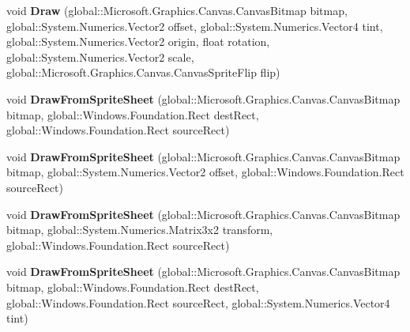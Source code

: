 \begin{DoxyCompactItemize}
void {\bfseries Draw} (global\+::\+Microsoft.\+Graphics.\+Canvas.\+Canvas\+Bitmap bitmap, global\+::\+System.\+Numerics.\+Vector2 offset, global\+::\+System.\+Numerics.\+Vector4 tint, global\+::\+System.\+Numerics.\+Vector2 origin, float rotation, global\+::\+System.\+Numerics.\+Vector2 scale, global\+::\+Microsoft.\+Graphics.\+Canvas.\+Canvas\+Sprite\+Flip flip)
\item 
\mbox{\label{class_microsoft_1_1_graphics_1_1_canvas_1_1_canvas_sprite_batch_aad806d7034e245c959c707dc4391e844}} 
void {\bfseries Draw\+From\+Sprite\+Sheet} (global\+::\+Microsoft.\+Graphics.\+Canvas.\+Canvas\+Bitmap bitmap, global\+::\+Windows.\+Foundation.\+Rect dest\+Rect, global\+::\+Windows.\+Foundation.\+Rect source\+Rect)
\item 
\mbox{\label{class_microsoft_1_1_graphics_1_1_canvas_1_1_canvas_sprite_batch_a92f0f8a12c6342a95d48002a8fd3b11c}} 
void {\bfseries Draw\+From\+Sprite\+Sheet} (global\+::\+Microsoft.\+Graphics.\+Canvas.\+Canvas\+Bitmap bitmap, global\+::\+System.\+Numerics.\+Vector2 offset, global\+::\+Windows.\+Foundation.\+Rect source\+Rect)
\item 
\mbox{\label{class_microsoft_1_1_graphics_1_1_canvas_1_1_canvas_sprite_batch_a0d74b7bfe143a9832126256d47c187e6}} 
void {\bfseries Draw\+From\+Sprite\+Sheet} (global\+::\+Microsoft.\+Graphics.\+Canvas.\+Canvas\+Bitmap bitmap, global\+::\+System.\+Numerics.\+Matrix3x2 transform, global\+::\+Windows.\+Foundation.\+Rect source\+Rect)
\item 
\mbox{\label{class_microsoft_1_1_graphics_1_1_canvas_1_1_canvas_sprite_batch_ad98b847473221fdac7fbd14a5b9be240}} 
void {\bfseries Draw\+From\+Sprite\+Sheet} (global\+::\+Microsoft.\+Graphics.\+Canvas.\+Canvas\+Bitmap bitmap, global\+::\+Windows.\+Foundation.\+Rect dest\+Rect, global\+::\+Windows.\+Foundation.\+Rect source\+Rect, global\+::\+System.\+Numerics.\+Vector4 tint)
\item 
\mbox{\label{class_microsoft_1_1_graphics_1_1_canvas_1_1_canvas_sprite_batch_af857e8b6752567fefd4c6a81a75b2e21}} 

\end{DoxyCompactItemize}
